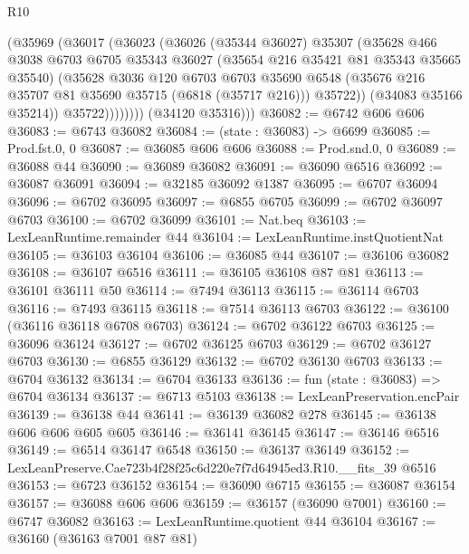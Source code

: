\begin{lexlean}{R10}
\begin{coremodule}
                  (@35969
                    (@36017
                      (@36023
                        (@36026
                          (@35344 @36027)
                          @35307
                          (@35628
                            @466
                            @3038
                            @6703
                            @6705
                            @35343
                            @36027
                            (@35654 @216 @35421 @81 @35343 @35665 @35540)
                            (@35628
                              @3036
                              @120
                              @6703
                              @6703
                              @35690
                              @6548
                              (@35676 @216 @35707 @81 @35690 @35715 (@6818 (@35717 @216)))
                              @35722))
                          (@34083 @35166 @35214))
                        @35722))))))))
        (@34120 @35316)))
@36082 := @6742 @606 @606
@36083 := @6743 @36082
@36084 := (state : @36083) -> @6699
@36085 := Prod.fst.{0, 0}
@36087 := @36085 @606 @606
@36088 := Prod.snd.{0, 0}
@36089 := @36088 @44
@36090 := @36089 @36082
@36091 := @36090 @6516
@36092 := @36087 @36091
@36094 := @32185 @36092 @1387
@36095 := @6707 @36094
@36096 := @6702 @36095
@36097 := @6855 @6705
@36099 := @6702 @36097 @6703
@36100 := @6702 @36099
@36101 := Nat.beq
@36103 := LexLeanRuntime.remainder @44
@36104 := LexLeanRuntime.instQuotientNat
@36105 := @36103 @36104
@36106 := @36085 @44
@36107 := @36106 @36082
@36108 := @36107 @6516
@36111 := @36105 @36108 @87 @81
@36113 := @36101 @36111 @50
@36114 := @7494 @36113
@36115 := @36114 @6703
@36116 := @7493 @36115
@36118 := @7514 @36113 @6703
@36122 := @36100 (@36116 @36118 @6708 @6703)
@36124 := @6702 @36122 @6703
@36125 := @36096 @36124
@36127 := @6702 @36125 @6703
@36129 := @6702 @36127 @6703
@36130 := @6855 @36129
@36132 := @6702 @36130 @6703
@36133 := @6704 @36132
@36134 := @6704 @36133
@36136 := fun (state : @36083) => @6704 @36134
@36137 := @6713 @5103
@36138 := LexLeanPreservation.encPair
@36139 := @36138 @44
@36141 := @36139 @36082 @278
@36145 := @36138 @606 @606 @605 @605
@36146 := @36141 @36145
@36147 := @36146 @6516
@36149 := @6514 @36147 @6548
@36150 := @36137 @36149
@36152 := LexLeanPreserve.Cae723b4f28f25c6d220e7f7d64945ed3.R10.__fits_39 @6516
@36153 := @6723 @36152
@36154 := @36090 @6715
@36155 := @36087 @36154
@36157 := @36088 @606 @606
@36159 := @36157 (@36090 @7001)
@36160 := @6747 @36082
@36163 := LexLeanRuntime.quotient @44 @36104
@36167 := @36160 (@36163 @7001 @87 @81)

\end{coremodule}
\end{lexlean}
